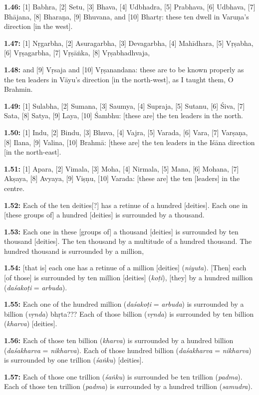 \documentclass{article}
\newcommand{\vsnum}[1]{\textbf{#1}}
\newcommand{\skt}[1]{\textit{#1}}
\begin{document}
\vsnum{1.46: }[1] Babhra, [2] Setu, [3] Bhava, [4] Udbhadra, [5] Prabhava, [6] Udbhava, [7] Bhājana, [8] Bharaṇa, [9] Bhuvana, and [10] Bhartṛ: these ten dwell in Varuṇa's direction [in the west].

\vsnum{1.47: }[1] Nṛgarbha, [2] Asuragarbha, [3] Devagarbha, [4] Mahīdhara, [5] Vṛṣabha, [6] Vṛṣagarbha, [7] Vṛṣāṅka, [8] Vṛṣabhadhvaja,

\vsnum{1.48: }and [9] Vṛsaja and [10] Vṛṣanandana: these are to be known properly as the ten leaders in Vāyu's direction [in the north-west], as I taught them, O Brahmin.

\vsnum{1.49: }[1] Sulabha, [2] Sumana, [3] Saumya, [4] Supraja, [5] Sutanu, [6] Śiva, [7] Sata, [8] Satya, [9] Laya, [10] Śambhu: [these are] the ten leaders in the north.

\vsnum{1.50: }[1] Indu, [2] Bindu, [3] Bhuva, [4] Vajra, [5] Varada, [6] Vara, [7] Varṣaṇa, [8] Ilana, [9] Valina, [10] Brahmā: [these are] the ten leaders in the Iśāna direction [in the north-east].

\vsnum{1.51: }[1] Apara, [2] Vimala, [3] Moha, [4] Nirmala, [5] Mana, [6] Mohana, [7] Akṣaya, [8] Avyaya, [9] Viṣṇu, [10] Varada: [these are] the ten [leaders] in the centre.

\vsnum{1.52: }Each of the ten deities[?] has a retinue of a hundred [deities]. Each one in [these groups of] a hundred [deities] is surrounded by a thousand.

\vsnum{1.53: }Each one in these [groups of] a thousand [deities] is surrounded by ten thousand [deities]. The ten thousand by a multitude of a hundred thousand. The hundred thousand is surrounded by a million,

\vsnum{1.54: }[that is] each one has a retinue of a million [deities] (\skt{niyuta}). [Then] each [of those] is surrounded by ten million [deities] (\skt{koṭi}), [they] by a hundred million (\skt{daśakoṭi} = \skt{arbuda}).

\vsnum{1.55: }Each one of the hundred million (\skt{daśakoṭi} = \skt{arbuda}) is surrounded by a billion (\skt{vṛnda}) bhṛta??? Each of those billion (\skt{vṛnda}) is surrounded by ten billion (\skt{kharva}) [deities].

\vsnum{1.56: }Each of those ten billion (\skt{kharva}) is surrounded by a hundred billion (\skt{daśakharva} = \skt{nikharva}). Each of those hundred billion (\skt{daśakharva} = \skt{nikharva}) is surrounded by one trillion (\skt{śaṅku}) [deities].

\vsnum{1.57: }Each of those one trillion (\skt{śaṅku}) is surrounded be ten trillion (\skt{padma}). Each of those ten trillion (\skt{padma}) is surrounded by a hundred trillion (\skt{samudra}).
\end{document}
